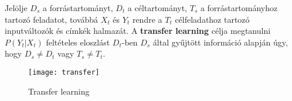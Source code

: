 \begin{definition}
	Jelölje $D_s$ a forrástartományt, $D_t$ a céltartományt, $T_s$ a forrástartományhoz tartozó feladatot, továbbá $X_t$ és $Y_t$ rendre a $T_t$ célfeladathoz tartozó inputváltozók és  címkék halmazát. A \textbf{transfer learning} célja megtanulni $P(Y_t|X_t)$ feltételes eloszlást $D_t$-ben $D_s$ által gyűjtött információ alapján úgy, hogy $D_s \neq D_t$ vagy $T_s \neq T_t$.	 
\end{definition}

\begin{figure}[H]
	\centering
	\texttt{[image: transfer]}
	\caption{Transfer learning}
\end{figure}







